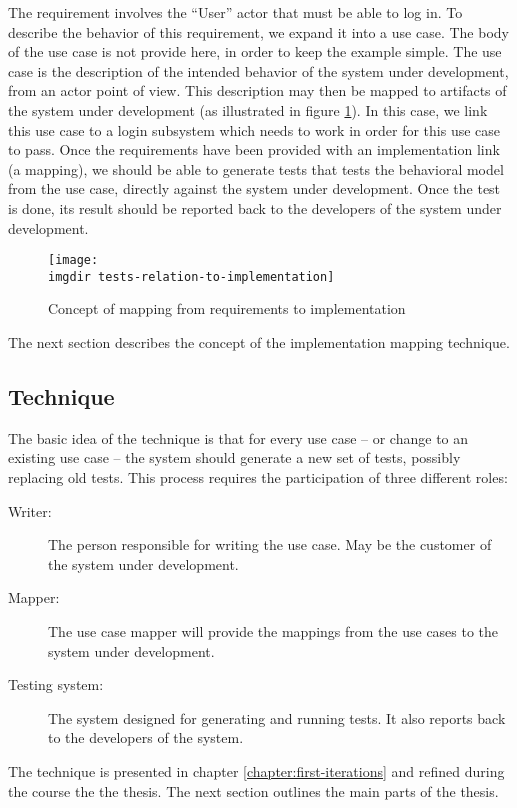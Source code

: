 \noindent
The requirement involves the ``User'' actor that must be able to log in. To describe the behavior of this requirement, we expand it into a use case. The body of the use case is not provide here, in order to keep the example simple. The use case is the description of the intended behavior of the system under development, from an actor point of view. This description may then be mapped to artifacts of the system under development (as illustrated in figure \ref{fig:tests-relation-to-implementation}). In this case, we link this use case to a login subsystem which needs to work in order for this use case to pass. Once the requirements have been provided with an implementation link (a mapping), we should be able to generate tests that tests the behavioral model from the use case, directly against the system under development. Once the test is done, its result should be reported back to the developers of the system under development.\medskip

\begin{figure}[!htbp]
\centering
\texttt{[image: \\imgdir tests-relation-to-implementation]}
\caption{Concept of mapping from requirements to implementation}
\label{fig:tests-relation-to-implementation}
\end{figure}

\noindent
The next section describes the concept of the implementation mapping technique.

\subsection{Technique}
The basic idea of the technique is that for every use case -- or change to an existing use case -- the system should generate a new set of tests, possibly replacing old tests. This process requires the participation of three different roles:

\begin{description}

  \item[Writer:] The person responsible for writing the use case. May be the customer of the system under development.

  \item[Mapper:] The use case mapper will provide the mappings from the use cases to the system under development.

  \item[Testing system:] The system designed for generating and running tests. It also reports back to the developers of the system.

\end{description}
\noindent
The technique is presented in chapter \ref{chapter:first-iterations} and refined during the course the the thesis. The next section outlines the main parts of the thesis.

